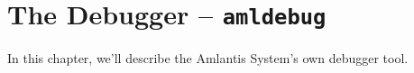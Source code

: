 
\chapter[The Debugger -- amldebug]{The Debugger -- \lstinline!amldebug!}
\label{ch:tools-amldebug}

In this chapter, we'll describe the Amlantis System's own debugger tool. 






